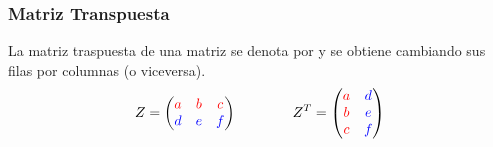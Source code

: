 \documentclass[stu, 12pt, a4paper, donotrepeattitle, floatsintext, natbib]{apa7}
\begin{document}
    \subsubsection{Matriz Transpuesta}
    La matriz traspuesta de una matriz se denota por y se obtiene cambiando sus filas por columnas (o viceversa).
    \[
        Z =
        \begin{pmatrix}
            \color{red} a  & \color{red} b & \color{red}c  \\
            \color{blue} d & \color{blue}e & \color{blue}f
        \end{pmatrix}
        \qquad \qquad
        Z^T =
        \begin{pmatrix}
            \color{red}a & \color{blue}d \\
            \color{red}b & \color{blue}e \\
            \color{red}c & \color{blue}f \\
        \end{pmatrix}
    \]
\end{document}
